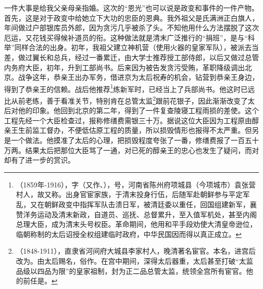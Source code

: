   一件大事是给我父亲母亲指婚。这次的“恩光”也可以说是政变和事件的一件产物。首先，这是对于政变中给她立下大功的忠臣的恩典。我外祖父是氏满洲正白旗人，年间做过户部银库员外郎，因为贪污几乎被杀了头。不知他用什么方法摆脱了这次厄运，又花钱买得候补道员的衔。这种做法就是清末广泛推行的“捐班”，是与“科举”同样合法的出身。初年，我祖父建立神机营（使用火器的皇家军队），被派去当差，做过翼长和总兵，经过一番累迁，由大学士推荐授工部侍郎，以后又做过总管内务府大臣，初年，升到工部尚书。后来因为被告发贪污受贿，革职降级调出北京。战争这年，恭亲王出办军务，借进京为太后祝寿的机会，钻营到恭亲王身边，得到了恭亲王的信赖。战后他推荐\footnote{（1859年-1916），字（又作、），号，河南省陈州府项城县（今项城市）袁张营村人，故又称。出身官宦家族，于清末投身行伍，后随军赴朝鲜参与平定军乱，又在朝鲜政变中指挥军队击溃日军，被清廷委以重任，回国组建新军，襄赞洋务运动及清末新政，自道员、巡抚、总督累升，至入值军机处，甚至内阁总理大臣，成为清末头号权臣。革命期间，他用和平手段劝使大清皇帝逊位，临朝称制的太后诏授全权组建临时政府，中华民国因而得以真正成立。}练新军时，已经当上了兵部尚书。他这时已远比从前老练，善于看准关节，特别肯在总管太监\footnote{（1848-1911），直隶省河间府大城县李家村人，晚清著名宦官。本名，进宫后改为。由太后赐名，俗作。在宫中期间，深得太后器重，太后甚至打破“太监品级以四品为限”的皇家祖制，封为正二品总管太监，统领全宫所有宦官。他的前任是。}跟前花银子，因此渐渐改变了太后对他的印象。他回到北京的第二年，得到了一件复查陵寝工程雨损的差使。这个工程先经一个大臣检查过，报称修缮费需银三十万。据说这位大臣因为工程原由醇亲王生前监工督办，不便低估原工程的质量，所以损毁情形也报得不太严重。但另是一个做法。他摸准了太后的心理，把损毁程度夸张了一番，修缮费报了一百五十万两。结果太后把那位大臣骂了一通，对已死的醇亲王的忠心也发生了疑问，而对却有了进一步的赏识。\\

